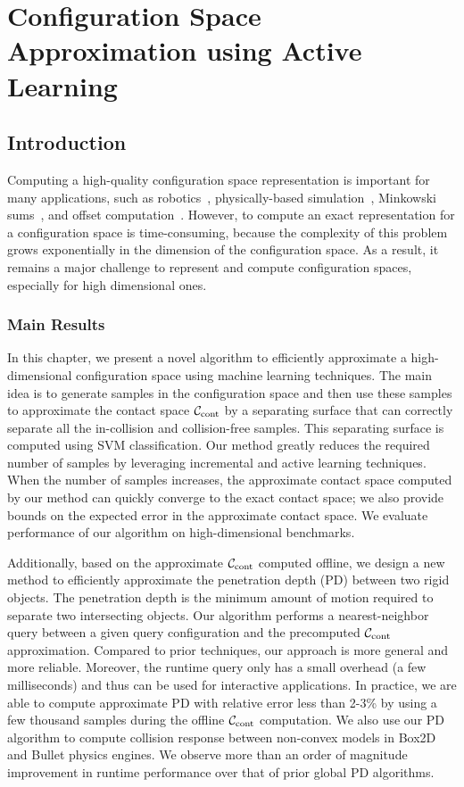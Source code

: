 \chapter{Configuration Space Approximation \mbox{using} Active Learning} 
\label{chp:APD}

\section{Introduction}
\label{sec:2:intro}
Computing a high-quality configuration space representation is important for many applications, such as robotics~\cite{LPT:SpatialPlanning:1983}, physically-based simulation~\cite{Je:2012:PRP}, Minkowski sums~\cite{Varadhan:2006:TPA}, and offset computation~\cite{Choi:1997:CAD}. 
However, to compute an exact representation for a configuration space is time-consuming, because the complexity of this problem grows exponentially in the dimension of the configuration space. As a result, it remains a major challenge to represent and compute configuration spaces, especially for high dimensional ones.

\subsection{Main Results}
In this chapter, we present a novel algorithm to efficiently approximate a high-dimensional configuration space using machine learning techniques. The main idea is to generate samples in the configuration space and then use these samples to approximate the contact space $\mathcal C_\text{cont}$ by a separating surface that can correctly separate all the in-collision and collision-free samples. This separating surface is computed using SVM classification. Our method greatly reduces the required number of samples by leveraging incremental and active learning techniques. 
When the number of samples increases, the approximate contact space computed by our method can quickly converge to the exact contact space; we also provide bounds on the expected error in the approximate contact space. We evaluate performance of our algorithm on high-dimensional benchmarks.

Additionally, based on the approximate $\mathcal C_\text{cont}$ computed offline, we design a new method to efficiently approximate the penetration depth (PD) between two rigid objects. The penetration depth is the minimum amount of motion required to separate two intersecting objects. Our algorithm performs a nearest-neighbor query between a given query configuration and the precomputed $\mathcal C_\text{cont}$ approximation. Compared to prior techniques, our approach is more general and more reliable. Moreover, the runtime query only has a small overhead (a few milliseconds) and thus can be used for interactive applications. In practice, we are able to compute approximate PD with relative error less than 2-3\% by using a few thousand samples during the offline $\mathcal C_\text{cont}$ computation. We also use our PD algorithm to compute collision response between non-convex models in Box2D and Bullet physics engines. We observe more than an order of magnitude improvement in runtime performance over that of prior global PD algorithms.


